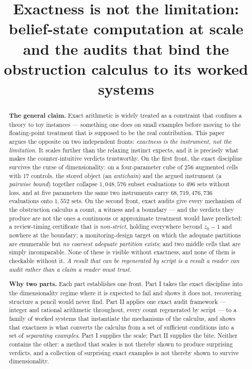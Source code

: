 \documentclass[10pt,twocolumn]{article}
\theoremstyle{plain}
\theoremstyle{definition}
\theoremstyle{remark}
\begin{document}
\title{Exactness is not the limitation: belief-state computation at scale and the audits that bind the obstruction calculus to its worked systems}
\begin{abstract}
\noindent\textbf{The general claim.} Exact arithmetic is widely treated as a constraint that
confines a theory to toy instances --- something one does on small examples before moving to the
floating-point treatment that is supposed to be the real contribution. This paper argues the
opposite on two independent fronts: \emph{exactness is the instrument, not the limitation.} It
scales further than the relaxing instinct expects, and it is precisely what makes the
counter-intuitive verdicts trustworthy. On the first front, the exact discipline survives the
curse of dimensionality: on a four-parameter cube of $256$ augmented cells with $17$ controls, the
stored object (an \emph{antichain}) and the argued instrument (a \emph{pairwise bound}) together
collapse $1{,}048{,}576$ subset evaluations to $496$ sets without loss, and at five parameters the
same two instruments carry $68{,}719{,}476{,}736$ evaluations onto $1{,}552$ sets. On the second
front, exact audits give every mechanism of the obstruction calculus a count, a witness and a
boundary --- and the verdicts they produce are not the ones a continuous or approximate treatment
would have predicted: a review-timing certificate that is \emph{non-strict}, holding everywhere
beyond $z_0 - 1$ and nowhere at the boundary; a monitoring-design target on which the adequate
partitions are enumerable but \emph{no coarsest adequate partition exists}; and two middle cells
that are simply incomparable. None of these is visible without exactness, and none of them is
checkable without it. \emph{A result that can be regenerated by script is a result a reader can
audit rather than a claim a reader must trust.}

\noindent\textbf{Why two parts.} Each part establishes one front. Part I takes the exact discipline
into the dimensionality regime where it is expected to fail and shows it does not, recovering
structure a pencil would never find. Part II applies one exact audit framework --- integer and
rational arithmetic throughout, every count regenerated by script --- to a family of worked systems
that instantiate the mechanisms of the calculus, and shows that exactness is what converts the
calculus from a set of sufficient conditions into a set of \emph{separating examples}. Part I
supplies the scale; Part II supplies the bite. Neither contains the other: a method that scales is
not thereby shown to produce surprising verdicts, and a collection of surprising exact examples is
not thereby shown to survive dimensionality.


\end{abstract}
\end{document}
